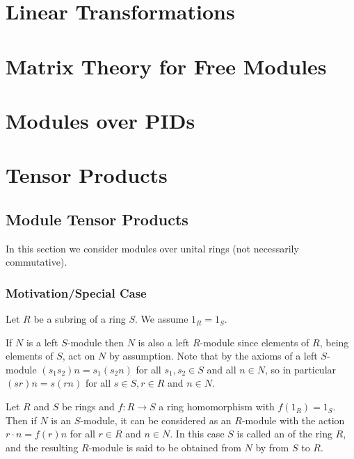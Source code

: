 \documentclass[12pt, a4paper, oneside, openright, titlepage]{book}
\begin{document}
\chapter{\textsection\textsection Linear Transformations}


\chapter{\textsection\textsection Matrix Theory for Free Modules}



\chapter{\textsection\textsection Modules over PIDs}


\chapter{\textsection\textsection Tensor Products}


\section{\textsection Module Tensor Products}

In this section we consider modules over unital rings (not necessarily commutative).

\subsection{Motivation/Special Case}

Let $R$ be a subring of a ring $S$. We assume $1_R = 1_S$.

If $N$ is a left $S$-module then $N$ is also a left $R$-module since elements of $R$, being elements of $S$, act on $N$ by assumption. Note that by the axioms of a left $S$-module $(s_1s_2)n = s_1(s_2n)$ for all $s_1,s_2 \in S$ and all $n \in N$, so in particular $(sr)n = s(rn)$ for all $s \in S, r \in R$ and $n \in N$.

\begin{defn}
    Let $R$ and $S$ be rings and $f:R\rightarrow S$ a ring homomorphism with $f(1_R) = 1_S$. Then if $N$ is an $S$-module, it can be considered as an $R$-module with the action $r\cdot n = f(r)n$ for all $r \in R$ and $n\in N$. In this case $S$ is called an  of the ring $R$, and the resulting $R$-module is said to be obtained from $N$ by  from $S$ to $R$.
\end{defn}
\end{document}
